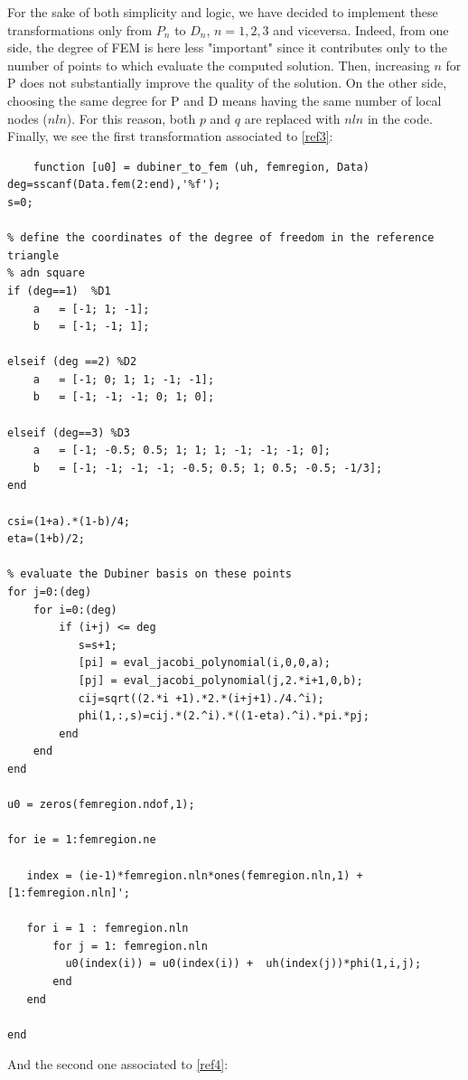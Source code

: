 \documentclass[a4paper,12pt]{article}
\begin{document}
	\vspace{5mm}
	\noindent For the sake of both simplicity and logic, we have decided to implement these transformations only from $P_n$ to $D_n$, $n=1,2,3$ and viceversa. Indeed, from one side, the degree of FEM is here less "important" since it contributes only to the number of points to which evaluate the computed solution. Then, increasing $n$ for P does not substantially improve the quality of the solution. On the other side, choosing the same degree for P and D means having the same number of local nodes ($nln$). For this reason, both $p$ and $q$ are replaced with $nln$ in the code.	
	Finally, we see the first transformation associated to \ref{ref3}:
	\begin{verbatim}
	function [u0] = dubiner_to_fem (uh, femregion, Data)         
deg=sscanf(Data.fem(2:end),'%f');
s=0;

% define the coordinates of the degree of freedom in the reference triangle
% adn square
if (deg==1)  %D1
    a   = [-1; 1; -1];
    b   = [-1; -1; 1];
    
elseif (deg ==2) %D2
    a   = [-1; 0; 1; 1; -1; -1];
    b   = [-1; -1; -1; 0; 1; 0];

elseif (deg==3) %D3
    a   = [-1; -0.5; 0.5; 1; 1; 1; -1; -1; -1; 0];
    b   = [-1; -1; -1; -1; -0.5; 0.5; 1; 0.5; -0.5; -1/3];   
end

csi=(1+a).*(1-b)/4;
eta=(1+b)/2;

% evaluate the Dubiner basis on these points
for j=0:(deg)
    for i=0:(deg)
        if (i+j) <= deg
           s=s+1;
           [pi] = eval_jacobi_polynomial(i,0,0,a);
           [pj] = eval_jacobi_polynomial(j,2.*i+1,0,b);
           cij=sqrt((2.*i +1).*2.*(i+j+1)./4.^i);
           phi(1,:,s)=cij.*(2.^i).*((1-eta).^i).*pi.*pj;
        end
    end
end

u0 = zeros(femregion.ndof,1);

for ie = 1:femregion.ne
    
   index = (ie-1)*femregion.nln*ones(femregion.nln,1) + [1:femregion.nln]';
   
   for i = 1 : femregion.nln
       for j = 1: femregion.nln
         u0(index(i)) = u0(index(i)) +  uh(index(j))*phi(1,i,j);
       end
   end
    
end
\end{verbatim}
And the second one associated to \ref{ref4}:
\end{document}
